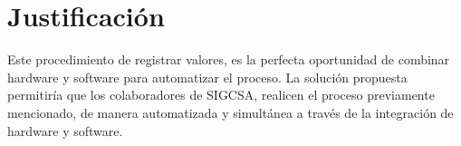\section{Justificación}

\par 
Este procedimiento de registrar valores, es la perfecta oportunidad de combinar hardware y software para automatizar el proceso.
La solución propuesta permitiría que los colaboradores de SIGCSA, realicen el proceso previamente mencionado, de manera automatizada y simultánea a través de la integración de hardware y software. 

